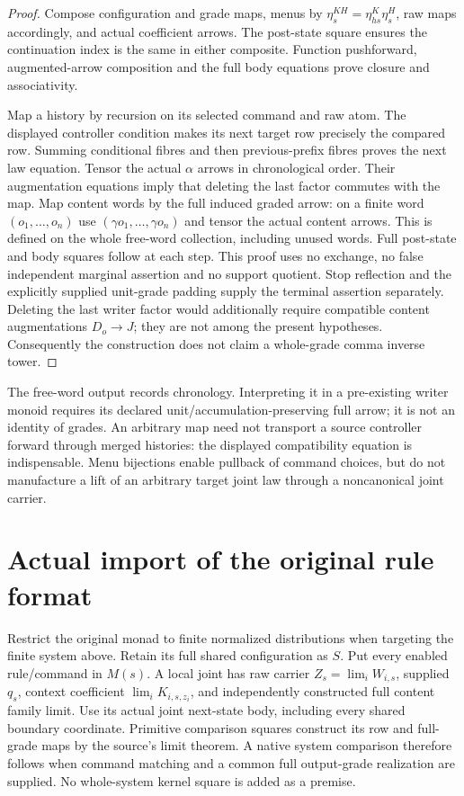 \documentclass[11pt]{article}
\begin{document}
\begin{proof}
Compose configuration and grade maps, menus by $\eta^{KH}_s=\eta^K_{hs}\eta^H_s$, raw maps accordingly, and actual coefficient arrows. The post-state square ensures the continuation index is the same in either composite. Function pushforward, augmented-arrow composition and the full body equations prove closure and associativity.

Map a history by recursion on its selected command and raw atom. The displayed controller condition makes its next target row precisely the compared row. Summing conditional fibres and then previous-prefix fibres proves the next law equation. Tensor the actual $\alpha$ arrows in chronological order. Their augmentation equations imply that deleting the last factor commutes with the map. Map content words by the full induced graded arrow: on a finite word $(o_1,\ldots,o_n)$ use $(\gamma o_1,\ldots,\gamma o_n)$ and tensor the actual content arrows. This is defined on the whole free-word collection, including unused words. Full post-state and body squares follow at each step. This proof uses no exchange, no false independent marginal assertion and no support quotient. Stop reflection and the explicitly supplied unit-grade padding supply the terminal assertion separately. Deleting the last writer factor would additionally require compatible content augmentations $D_o\to J$; they are not among the present hypotheses. Consequently the construction does not claim a whole-grade comma inverse tower.
\end{proof}
The free-word output records chronology. Interpreting it in a pre-existing writer monoid requires its declared unit/accumulation-preserving full arrow; it is not an identity of grades. An arbitrary map need not transport a source controller forward through merged histories: the displayed compatibility equation is indispensable. Menu bijections enable pullback of command choices, but do not manufacture a lift of an arbitrary target joint law through a noncanonical joint carrier.

\section{Actual import of the original rule format}
Restrict the original monad to finite normalized distributions when targeting the finite system above. Retain its full shared configuration as $S$. Put every enabled rule/command in $M(s)$. A local joint has raw carrier $Z_s=\lim_i W_{i,s}$, supplied $q_s$, context coefficient $\lim_i K_{i,s,z_i}$, and independently constructed full content family limit. Use its actual joint next-state body, including every shared boundary coordinate. Primitive comparison squares construct its row and full-grade maps by the source's limit theorem. A native system comparison therefore follows when command matching and a common full output-grade realization are supplied. No whole-system kernel square is added as a premise.
\end{document}
